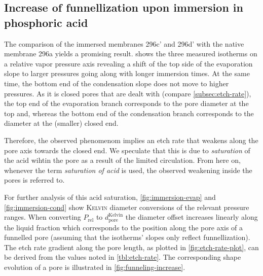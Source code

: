\documentclass[../thesis.tex]{subfiles}
\begin{document}
        \subsection{Increase of funnellization upon immersion in phosphoric acid}
        \label{subsec:immersion-funnelling}

          

          The comparison of the immersed membranes 296c' and 296d' with the native membrane 296a yields a promising result.  shows the three measured isotherms on a relative vapor pressure axis revealing a shift of the top side of the evaporation slope to larger pressures going along with longer immersion times. At the same time, the bottom end of the condensation slope does not move to higher pressures. As it is closed pores that are dealt with (compare \cref{subsec:etch-rate}), the top end of the evaporation branch corresponds to the pore diameter at the top and, whereas the bottom end of the condensation branch corresponds to the diameter at the (smaller) closed end.
          \medskip

          Therefore, the observed phenomenom implies an etch rate that weakens along the pore axis towards the closed end. We speculate that this is due to \textit{saturation} of the acid wihtin the pore as a result of the limited circulation. From here on, whenever the term \textit{saturation of acid} is used, the observed weakening inside the pores is referred to.
          \medskip

          For further analysis of this acid saturation, \cref{fig:immersion-evap} and \cref{fig:immersion-cond} show \textsc{Kelvin} diameter conversions of the relevant pressure ranges. When converting $P_\mathrm{rel}$ to $d_\mathrm{pore}^\mathrm{Kelvin}$ the diameter offset increases linearly along the liquid fraction which corresponds to the position along the pore axis of a funnelled pore (assuming that the isotherms' slopes only reflect funnellization). The etch rate gradient along the pore length, as plotted in \cref{fig:etch-rate-plot}, can be derived from the values noted in \cref{tbl:etch-rate}. The corresponding shape evolution of a pore is illustrated in \cref{fig:funneling-increase}.
\end{document}
